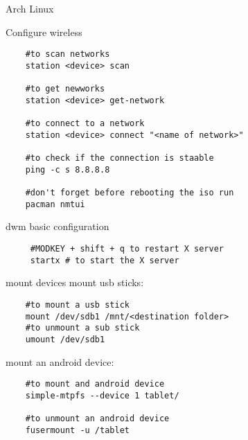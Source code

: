 \begin{section}{Arch Linux}
\begin{subsection}{Configure wireless}
\begin{verbatim}
	#to scan networks
	station <device> scan

	#to get newworks
	station <device> get-network

	#to connect to a network
	station <device> connect "<name of network>"

	#to check if the connection is staable
	ping -c s 8.8.8.8

	#don't forget before rebooting the iso run
	pacman nmtui
\end{verbatim}

 dwm basic configuration
 \begin{verbatim}
	 #MODKEY + shift + q to restart X server
	 startx # to start the X server
\end{verbatim}

\end{subsection}
\begin{subsection}{mount devices}
mount usb sticks:
\begin{verbatim}
	#to mount a usb stick
	mount /dev/sdb1 /mnt/<destination folder>
	#to unmount a sub stick
	umount /dev/sdb1
\end{verbatim}
mount an android device:
\begin{verbatim}
	#to mount and android device
	simple-mtpfs --device 1 tablet/

	#to unmount an android device
	fusermount -u /tablet

\end{verbatim}

\end{subsection}

\end{section}
